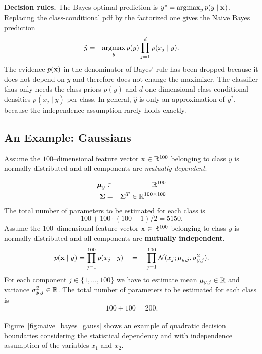   \textbf{Decision rules.}
  The Bayes-optimal prediction is $y^* = \operatorname*{argmax}_y p(y\mid\bm{\mathrm{x}})$. Replacing the class-conditional pdf by the factorized one gives the Naive Bayes prediction
      \begin{eqnarray*}
        \hat y &=& \operatorname*{argmax}\limits_{y} p(y)\prod_{j=1}^d p(x_j \mid y).
      \end{eqnarray*}
  The evidence $p(\bm{\mathrm{x}})$ in the denominator of Bayes' rule has been dropped because it does not depend on $y$ and therefore does not change the maximizer. The classifier thus only needs the class priors $p(y)$ and $d$ one-dimensional class-conditional densities $p(x_j\mid y)$ per class. In general, $\hat y$ is only an approximation of $y^*$, because the independence assumption rarely holds exactly.

\subsection{An Example: Gaussians}
  Assume the $100$--dimensional feature vector $\bm{\mathrm{x}}\in \mathbb{R}^{100}$ belonging to class $y$ is normally distributed and all components are {\em mutually dependent}:
 
    \begin{eqnarray*}
      \bm{\mathrm{\mu}}_y &\in& \mathbb{R}^{100} \\
      \mathbf{\Sigma} &=&  \mathbf{\Sigma}^T \in \mathbb{R}^{100\times 100} 
    \end{eqnarray*}
    The total number of parameters to be estimated for each class is  $$100+100\cdot (100+1)/2= 5150.$$
 Assume the $100$--dimensional feature vector $\bm{\mathrm{x}}\in \mathbb{R}^{100}$ belonging to class $y$ is normally distributed and all components are \textbf{mutually independent}. 
    \begin{displaymath}
      p(\bm{\mathrm{x}}\mid y) = \prod_{j=1}^{100} p(x_j \mid y) \quad = \quad \prod_{j=1}^{100} \mathcal N(x_j;\mu_{y,j}, \sigma^2_{y,j}).
    \end{displaymath}
    For each component $j\in\{1,\dots,100\}$ we have to estimate mean $\mu_{y,j}\in \mathbb{R}$ and variance $\sigma_{y,j}^2\in \mathbb{R}$.
    The total number of parameters to be estimated for each class is  $$100+100= 200.$$\\
    Figure~\ref{fig:naive_bayes_gauss} shows an example of quadratic decision boundaries considering the statistical dependency and with independence assumption of the variables $x_1$ and $x_2$. 

